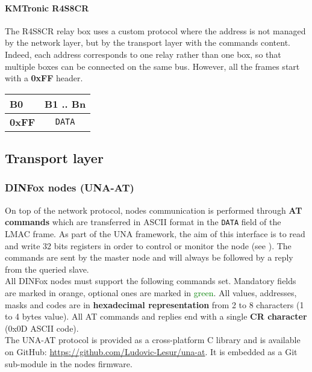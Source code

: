 \paragraph{KMTronic R4S8CR}

The R4S8CR relay box uses a custom protocol where the address is not managed by the network layer, but by the transport layer with the commands content. Indeed, each address corresponds to one relay rather than one box, so that multiple boxes can be connected on the same bus. However, all the frames start with a \textbf{0xFF} header. \pfs

\begin{table}[!h]
    \centering
    \begin{tabular}{|m{40mm}m{125mm}|}
        \hline
        \cellcolor{LightGray}\centering \textbf{B0} &
        \cellcolor{LightGray}\centering \textbf{B1 .. Bn} \tabularnewline
        \hline
        \multicolumn{1}{|c}{\cellcolor{LightBlue}\centering \textbf{0xFF}} &
        \multicolumn{1}{|c|}{\centering \texttt{DATA}} \tabularnewline
        \hline
    \end{tabular}
\end{table}

\newpage

\subsection{Transport layer}

\subsubsection{DINFox nodes (UNA-AT)}

On top of the network protocol, nodes communication is performed through \textbf{AT commands} which are transferred in ASCII format in the \texttt{DATA} field of the LMAC frame. As part of the UNA framework, the aim of this interface is to read and write 32 bits registers in order to control or monitor the node (see ). The commands are sent by the master node and will always be followed by a reply from the queried slave.
\medskip \\
All DINFox nodes must support the following commands set. Mandatory fields are marked in \textcolor{RedOrange}{orange}, optional ones are marked in \textcolor{Green}{green}. All values, addresses, masks and codes are in \textbf{hexadecimal representation} from 2 to 8 characters (1 to 4 bytes value). All AT commands and replies end with a single \textbf{CR character} (0x0D ASCII code).
\medskip \\
The UNA-AT protocol is provided as a cross-platform C library and is available on GitHub: \url{https://github.com/Ludovic-Lesur/una-at}. It is embedded as a Git sub-module in the nodes firmware. \pfs

